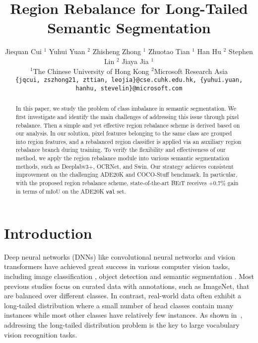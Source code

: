 \documentclass[final]{cvpr}
\begin{document}
\title{Region Rebalance for Long-Tailed Semantic Segmentation}
\author{
	Jiequan Cui $^{1}$ \quad 
	Yuhui Yuan $^{2}$ \quad
	Zhisheng Zhong $^{1}$ \quad
	Zhuotao Tian $^{1}$ \quad
	Han Hu $^{2}$ \quad
	Stephen Lin $^{2}$ \quad
	Jiaya Jia $^{1}$ \\
	$^{1}$The Chinese University of Hong Kong \hspace{1cm} $^{2}$Microsoft Research Asia \hspace{1cm} 
    \vspace{.7em}\\
	{\tt\small \{jqcui, zszhong21, zttian, leojia\}@cse.cuhk.edu.hk, \{yuhui.yuan, hanhu, stevelin\}@microsoft.com}
}

\maketitle

\begin{abstract}
In this paper, we study the problem of class imbalance in semantic segmentation.
We first investigate and identify the main challenges of addressing this issue through pixel rebalance. Then a simple and yet effective region rebalance scheme is derived based on our analysis. In our solution, pixel features belonging to the same class are grouped into region features, and a rebalanced region classifier is applied via an auxiliary region rebalance branch during training.
To verify the flexibility and effectiveness of our method,
we apply the region rebalance module into various semantic segmentation methods, such as Deeplabv$3$+, OCRNet, and Swin.
Our strategy achieves consistent improvement on the challenging ADE$20$K and COCO-Stuff benchmark.
In particular, with the proposed region rebalance scheme, state-of-the-art \textsc{BEiT} receives +\textbf{$0.7\%$} gain in terms of $\mathrm{mIoU}$ on the ADE$20$K \texttt{val} set.
\end{abstract}


\section{Introduction}
Deep neural networks (DNNs) like convolutional neural networks \cite{alexnet,he2016deep,vggnet,googlenet} and vision transformers \cite{dosovitskiy2020image, touvron2021training, liu2021swin} have achieved great success in various computer vision tasks, including image classification \cite{alexnet,he2016deep,vggnet,googlenet}, object detection \cite{ren2015faster,DBLP:conf/cvpr/LinDGHHB17,DBLP:conf/cvpr/LiuQQSJ18} and semantic segmentation \cite{DBLP:conf/cvpr/ZhaoSQWJ17, chen2018encoder, xiao2018unified, yuan2020object}.
Most previous studies focus on curated data with annotations, such as ImageNet, that are balanced over different classes. In contrast, real-world data often exhibit a long-tailed distribution where a small number of head classes contain many instances while most other classes have relatively few instances.
As shown in~\cite{Gupta2019LVIS}, addressing the long-tailed distribution problem is the key to large vocabulary vision recognition tasks.
\end{document}
